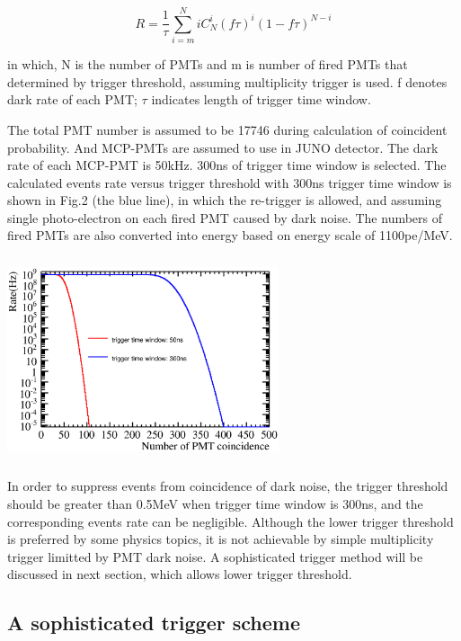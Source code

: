 \documentclass[a4paper,10pt,twoside]{paper}
\begin{document}
\begin{multicols}{2}
		\begin{displaymath}
			R = \frac{1}{\tau}\sum_{i=m}^{N}iC^{i}_{N}(f\tau)^i
			(1-f\tau)^{N-i}
		\end{displaymath}

		in which, N is the number of PMTs and m is number of fired PMTs that determined by trigger threshold, assuming multiplicity trigger is used.
		f denotes dark rate of each PMT; $\tau$ indicates length of trigger time window.

		The total PMT number is assumed to be 17746 during calculation of coincident probability. 
		And MCP-PMTs are assumed to use in JUNO detector. The dark rate of each MCP-PMT is 50kHz. 300ns of trigger time window is selected.
		The calculated events rate versus trigger threshold with 300ns trigger time window
		is shown in Fig.2 (the blue line), in which the re-trigger is allowed,
		and assuming single photo-electron on each fired PMT caused by dark noise.
		The numbers of fired PMTs are also converted into energy based on energy scale of 1100pe/MeV.

		\begin{center}
			\includegraphics[width=8cm,height=6cm]{Rate_all.eps}
		\end{center}


		In order to suppress events from coincidence of dark noise, the trigger threshold should be greater than 0.5MeV when trigger time window is 300ns, 
		and the corresponding events rate can be negligible. Although the lower trigger threshold is preferred by some physics topics,
		it is not achievable by simple multiplicity trigger limitted by PMT dark noise. A sophisticated trigger method will
		be discussed in next section, which allows lower trigger threshold. 


		\subsection{A sophisticated trigger scheme}


\end{multicols}
\end{document}
